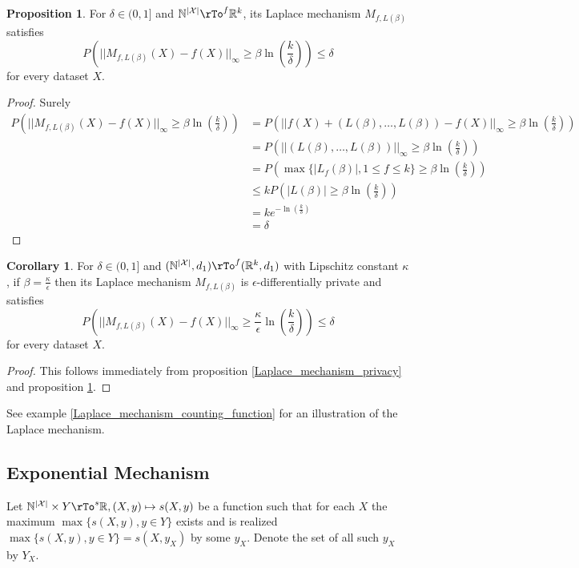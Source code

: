 \documentclass[12pt]{amsart}
\theoremstyle{definition}
\newtheorem{corollary}[theorem]{Corollary}
\newtheorem{proposition}[theorem]{Proposition}
\begin{document}
\begin{proposition} \label{Laplace_mechanism_accuracy} For $\delta \in (0, 1]$ and $\mathbb{N}^{|\mathcal{X}|} \rTo^f \mathbb{R}^k$, its Laplace mechanism $M_{f, L(\beta)}$ satisfies
$$P\left( ||M_{f, L(\beta)}(X) - f(X)||_{\infty} \geq \beta \ln \left( \frac{k}{\delta} \right) \right) \leq \delta$$
for every dataset $X$.
\end{proposition}
\begin{proof} Surely
\begin{align*}
P\left( ||M_{f, L(\beta)}(X) - f(X)||_{\infty} \geq \beta \ln \left( \frac{k}{\delta} \right) \right) & = P\left( ||f(X) + (L(\beta), \dots , L(\beta)) - f(X)||_{\infty} \geq \beta \ln \left( \frac{k}{\delta} \right) \right) \\
 & = P\left( ||(L(\beta), \dots , L(\beta))||_{\infty} \geq \beta \ln \left( \frac{k}{\delta} \right) \right) \\
& = P\left( \max\{|L_f(\beta)|, 1 \leq f \leq k\} \geq \beta \ln \left( \frac{k}{\delta} \right) \right) \\
 & \leq k P\left( |L(\beta)| \geq \beta \ln \left( \frac{k}{\delta} \right) \right) \\
 & = k e^{- \ln \left( \frac{k}{\delta} \right)} \\
 & = \delta
\end{align*}
\end{proof}

\begin{corollary} \label{Laplace_mechanism_accuracy_one_case} For $\delta \in (0, 1]$ and $(\mathbb{N}^{|\mathcal{X}|}, d_1) \rTo^f (\mathbb{R}^k, d_1)$ with Lipschitz constant $\kappa$, if $\beta = \frac{\kappa}{\epsilon}$ then its Laplace mechanism $M_{f, L(\beta)}$ is $\epsilon$-differentially private and satisfies
$$P\left( ||M_{f, L(\beta)}(X) - f(X)||_{\infty} \geq \frac{\kappa}{\epsilon} \ln \left( \frac{k}{\delta} \right) \right) \leq \delta$$
for every dataset $X$.
\end{corollary}
\begin{proof} This follows immediately from proposition \ref{Laplace_mechanism_privacy} and proposition \ref{Laplace_mechanism_accuracy}.
\end{proof}

See example \ref{Laplace_mechanism_counting_function} for an illustration of the Laplace mechanism.

\subsection{Exponential Mechanism} \label{exponential_mechanism} Let $\mathbb{N}^{|\mathcal{X}|} \times Y \rTo^s \mathbb{R}, (X, y) \mapsto s(X, y)$ be a function such that for each $X$ the maximum $\max \{s(X, y), y \in Y\}$ exists and is realized $\max \{s(X, y), y \in Y\} = s(X, y_X) $ by some $y_X$. Denote the set of all such $y_X$ by $Y_X$.
\end{document}
